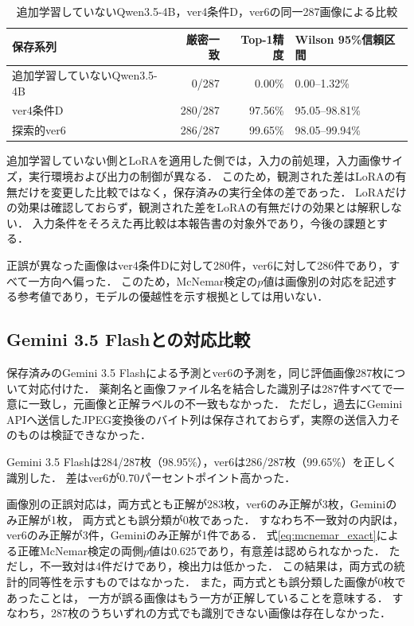 \documentclass[uplatex,dvipdfmx]{jsarticle}
\begin{document}
\begin{table}[htbp]
  \centering
  \caption{追加学習していないQwen3.5-4B，ver4条件D，ver6の同一287画像による比較}
  \label{tab:qwen_baseline}
  \small
  \begin{tabular}{|p{4.6cm}|r|r|p{3.1cm}|}
    \hline
    保存系列 & 厳密一致 & Top-1精度 & Wilson 95\%信頼区間 \\ \hline
    追加学習していないQwen3.5-4B & 0/287 & 0.00\% & 0.00--1.32\% \\ \hline
    ver4条件D & 280/287 & 97.56\% & 95.05--98.81\% \\ \hline
    探索的ver6 & 286/287 & 99.65\% & 98.05--99.94\% \\ \hline
  \end{tabular}
\end{table}

追加学習していない側とLoRAを適用した側では，入力の前処理，入力画像サイズ，実行環境および出力の制御が異なる．
このため，観測された差はLoRAの有無だけを変更した比較ではなく，保存済みの実行全体の差であった．
LoRAだけの効果は確認しておらず，観測された差をLoRAの有無だけの効果とは解釈しない．
入力条件をそろえた再比較は本報告書の対象外であり，今後の課題とする．

正誤が異なった画像はver4条件Dに対して280件，ver6に対して286件であり，すべて一方向へ偏った．
このため，McNemar検定の$p$値は画像別の対応を記述する参考値であり，モデルの優越性を示す根拠としては用いない．

\subsection{Gemini 3.5 Flashとの対応比較}\label{sec:gemini_compare}

保存済みのGemini 3.5 Flashによる予測とver6の予測を，同じ評価画像287枚について対応付けた．
薬剤名と画像ファイル名を結合した識別子は287件すべてで一意に一致し，元画像と正解ラベルの不一致もなかった．
ただし，過去にGemini APIへ送信したJPEG変換後のバイト列は保存されておらず，実際の送信入力そのものは検証できなかった．

Gemini 3.5 Flashは284/287枚（98.95\%），ver6は286/287枚（99.65\%）を正しく識別した．
差はver6が0.70パーセントポイント高かった．

画像別の正誤対応は，両方式とも正解が283枚，ver6のみ正解が3枚，Geminiのみ正解が1枚，
両方式とも誤分類が0枚であった．
すなわち不一致対の内訳は，ver6のみ正解が3件，Geminiのみ正解が1件である．
式\eqref{eq:mcnemar_exact}による正確McNemar検定の両側$p$値は0.625であり，有意差は認められなかった．
ただし，不一致対は4件だけであり，検出力は低かった．
この結果は，両方式の統計的同等性を示すものではなかった．
また，両方式とも誤分類した画像が0枚であったことは，
一方が誤る画像はもう一方が正解していることを意味する．
すなわち，287枚のうちいずれの方式でも識別できない画像は存在しなかった．
\end{document}
